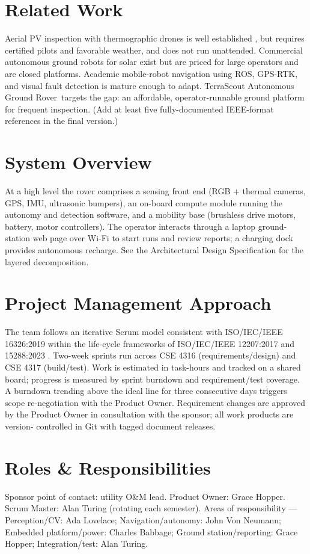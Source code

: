 \documentclass[11pt,letterpaper]{article}
\newcommand{\productname}{TerraScout Autonomous Ground Rover}
\begin{document}
\section{Related Work}
Aerial PV inspection with thermographic drones is well established
\cite{Rubin2012}, but requires certified pilots and favorable weather, and does
not run unattended. Commercial autonomous ground robots for solar exist but are
priced for large operators and are closed platforms. Academic mobile-robot
navigation using ROS, GPS-RTK, and visual fault detection is mature enough to
adapt. \productname\ targets the gap: an affordable, operator-runnable ground
platform for frequent inspection. (Add at least five fully-documented IEEE-format
references in the final version.)

\section{System Overview}
At a high level the rover comprises a sensing front end (RGB + thermal cameras,
GPS, IMU, ultrasonic bumpers), an on-board compute module running the autonomy and
detection software, and a mobility base (brushless drive motors, battery, motor
controllers). The operator interacts through a laptop ground-station web page over
Wi-Fi to start runs and review reports; a charging dock provides autonomous
recharge. See the Architectural Design Specification for the layered decomposition.

\section{Project Management Approach}
The team follows an iterative Scrum model \cite{Rubin2012, SchwaberSutherland2020}
consistent with ISO/IEC/IEEE 16326:2019 \cite{ISO16326} within the life-cycle
frameworks of ISO/IEC/IEEE 12207:2017 \cite{ISO12207} and 15288:2023
\cite{ISO15288}. Two-week sprints run across CSE 4316 (requirements/design) and
CSE 4317 (build/test). Work is estimated in task-hours and tracked on a shared
board; progress is measured by sprint burndown and requirement/test coverage. A
burndown trending above the ideal line for three consecutive days triggers scope
re-negotiation with the Product Owner. Requirement changes are approved by the
Product Owner in consultation with the sponsor; all work products are version-
controlled in Git with tagged document releases.

\section{Roles \& Responsibilities}
Sponsor point of contact: utility O\&M lead. Product Owner: Grace Hopper.
Scrum Master: Alan Turing (rotating each semester). Areas of responsibility ---
Perception/CV: Ada Lovelace; Navigation/autonomy: John Von Neumann; Embedded
platform/power: Charles Babbage; Ground station/reporting: Grace Hopper;
Integration/test: Alan Turing.
\end{document}
